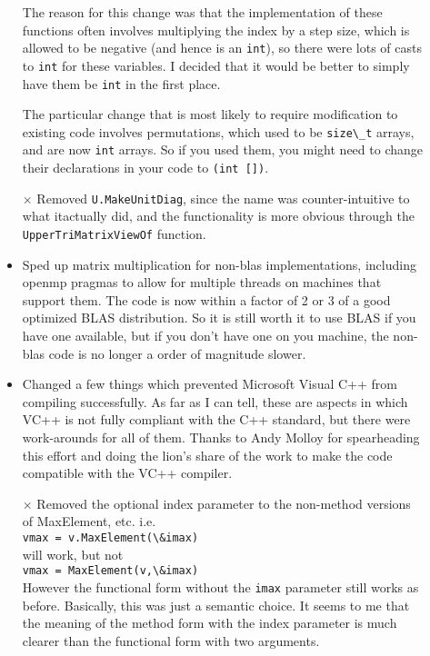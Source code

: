 \documentclass[twoside,letterpaper,11pt]{article}
\renewcommand{\tt}[1]{{\lstinline {#1}}}
\begin{document}
\begin{description}
\begin{itemize}
The reason for this change
was that the implementation of these
functions often involves multiplying the index
by a step size, which is allowed to be negative (and hence
is an \tt{int}), so there were lots of casts to \tt{int} for these variables.
I decided that it would be better to simply have them be \tt{int} in the first place.

The particular change that is most likely to require modification to existing code
involves permutations, which used to be \tt{size\_t} arrays, and are now
\tt{int} arrays.  So if you used them, you might need to change their
declarations in your code to \tt{(int [])}.
\item[$\times$]
Removed \tt{U.MakeUnitDiag}, since the name was counter-intuitive to what itactually did, and the functionality is more obvious through the
\tt{UpperTriMatrixViewOf} function.
\item
Sped up matrix multiplication for non-blas implementations, including
openmp pragmas to allow for multiple threads on machines that support them.
The code is now within a factor of 2 or 3 of a good optimized BLAS 
distribution.  So it is still worth it to use BLAS if you have one available,
but if you don't have one on you machine, the non-blas code is no longer a
order of magnitude slower.
\item
Changed a few things which prevented Microsoft Visual C++ from compiling successfully.  
As far as I can tell, these are aspects in which VC++ is not fully compliant with the C++ 
standard, but there were work-arounds for all of them.
Thanks to Andy Molloy
for spearheading this effort and doing the lion's share of the work to make
the code compatible with the VC++ compiler.
\item[$\times$]
Removed the optional index parameter to the non-method versions of 
MaxElement, etc.   i.e.\\
\tt{vmax = v.MaxElement(\&imax)}\\
will work, but not\\
\tt{vmax = MaxElement(v,\&imax)}\\
However the functional form without the \tt{imax} parameter still works as before.
Basically, this was just a semantic choice.  It seems to me that the meaning of the method
form with the index parameter is much clearer than the functional form with two arguments.


\end{itemize}
\end{description}
\end{document}

